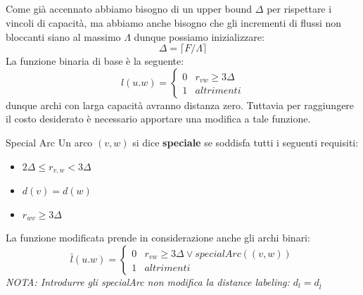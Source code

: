 \documentclass[a4paper, 11pt]{report}
\begin{document}
    \subparagraph*{} Come già accennato abbiamo bisogno di un upper bound $\Delta$ per rispettare i vincoli di capacità, ma abbiamo anche bisogno che gli incrementi di flussi non bloccanti siano al massimo $\Lambda$ dunque possiamo inizializzare:
    \[\Delta= \lceil F/\Lambda \rceil \]
    La funzione binaria di base è la seguente:
    \[l(u.w) = \left \{ \begin{array}{ll}
        0 & r_{vw} \ge 3\Delta\\
        1 & altrimenti
    \end{array} \right .\]
    dunque archi con larga capacità avranno distanza zero. Tuttavia per raggiungere il costo desiderato è necessario apportare una modifica a tale funzione.
    \begin{definition}{Special Arc}{}
        Un arco $(v,w)$ si dice \textbf{speciale} se soddisfa tutti i seguenti requisiti:
        \begin{itemize}
            \item $2\Delta \le r_{v,w} < 3\Delta$
            \item $d(v) = d(w)$
            \item $r_{wv} \ge 3\Delta$
        \end{itemize}
    \end{definition}    
    La funzione modificata prende in considerazione anche gli archi binari:
    \[\bar{l}(u.w) = \left \{ \begin{array}{ll}
        0 & r_{vw} \ge 3\Delta \lor specialArc((v,w))\\
        1 & altrimenti
    \end{array} \right .\]
\textit{NOTA: Introdurre gli specialArc non modifica la distance labeling: $d_l = d_{\bar{l}}$}
\end{document}
